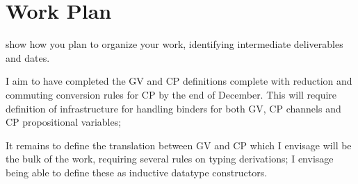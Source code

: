 \documentclass{mprop}
\begin{document}
\section{Work Plan}

show how you plan to organize your work, identifying intermediate deliverables
and dates.

I aim to have completed the GV and CP definitions complete with reduction and commuting conversion rules for CP by the end of December. This will require definition of infrastructure for handling binders for both GV, CP channels and CP propositional variables; 

It remains to define the translation between GV and CP which I envisage will be the bulk of the work, requiring several rules on typing derivations; I envisage being able to define these as inductive datatype constructors.


\printbibliography
\end{document}
